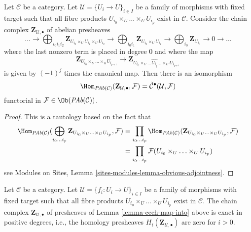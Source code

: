 \begin{lemma}
\label{lemma-cech-map-into}
Let $\mathcal{C}$ be a category. Let $\mathcal{U} = \{U_i \to U\}_{i \in I}$
be a family of morphisms with fixed target such that all fibre products
$U_{i_0} \times_U \ldots \times_U U_{i_p}$ exist in $\mathcal{C}$.
Consider the chain complex $\mathbf{Z}_{\mathcal{U}, \bullet}$
of abelian presheaves
$$
\ldots
\to
\bigoplus_{i_0i_1i_2} \mathbf{Z}_{U_{i_0} \times_U U_{i_1} \times_U U_{i_2}}
\to
\bigoplus_{i_0i_1} \mathbf{Z}_{U_{i_0} \times_U U_{i_1}}
\to
\bigoplus_{i_0} \mathbf{Z}_{U_{i_0}}
\to 0 \to \ldots
$$
where the last nonzero term is placed in degree $0$
and where the map
$$
\mathbf{Z}_{U_{i_0} \times_U \ldots \times_u U_{i_{p + 1}}}
\longrightarrow
\mathbf{Z}_{U_{i_0} \times_U
\ldots \widehat{U_{i_j}} \ldots \times_U U_{i_{p + 1}}}
$$
is given by $(-1)^j$ times the canonical map.
Then there is an isomorphism
$$
\Hom_{\textit{PAb}(\mathcal{C})}(\mathbf{Z}_{\mathcal{U}, \bullet}, \mathcal{F})
=
\check{\mathcal{C}}^\bullet(\mathcal{U}, \mathcal{F})
$$
functorial in $\mathcal{F} \in \Ob(\textit{PAb}(\mathcal{C}))$.
\end{lemma}

\begin{proof}
This is a tautology based on the fact that
\begin{align*}
\Hom_{\textit{PAb}(\mathcal{C})}(
\bigoplus_{i_0 \ldots i_p}
\mathbf{Z}_{U_{i_0} \times_U \ldots \times_U U_{i_p}},
\mathcal{F})
& =
\prod_{i_0 \ldots i_p}
\Hom_{\textit{PAb}(\mathcal{C})}(
\mathbf{Z}_{U_{i_0} \times_U \ldots \times_U U_{i_p}},
\mathcal{F}) \\
& =
\prod_{i_0 \ldots i_p}
\mathcal{F}(U_{i_0} \times_U \ldots \times_U U_{i_p})
\end{align*}
see Modules on Sites, Lemma \ref{sites-modules-lemma-obvious-adjointness}.
\end{proof}

\begin{lemma}
\label{lemma-homology-complex}
Let $\mathcal{C}$ be a category. Let
$\mathcal{U} = \{f_i : U_i \to U\}_{i \in I}$ be a family of morphisms
with fixed target such that all fibre products
$U_{i_0} \times_U \ldots \times_U U_{i_p}$ exist in $\mathcal{C}$.
The chain complex $\mathbf{Z}_{\mathcal{U}, \bullet}$ of presheaves
of Lemma \ref{lemma-cech-map-into} above is exact in positive
degrees, i.e., the homology presheaves
$H_i(\mathbf{Z}_{\mathcal{U}, \bullet})$ are zero for $i > 0$.
\end{lemma}

